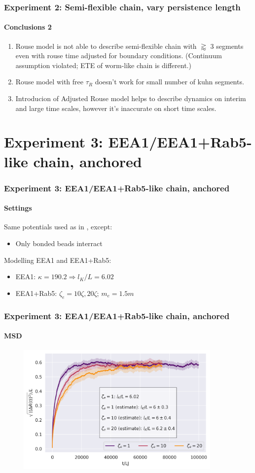 \documentclass[handout]{beamer}
\begin{document}
\begin{frame}
    \frametitle{Experiment 2: Semi-flexible chain, vary persistence length}
    \framesubtitle{Conclusions 2}
    \begin{enumerate}
        \item Rouse model is not able to describe semi-flexible chain with $\gtrapprox$ 3 segments
        even with rouse time adjusted for boundary conditions. 
        (Continuum assumption violated; ETE of worm-like chain is different.)
        \item Rouse model with free $\tau_R$ doesn't work for small number 
        of kuhn segments.
        \item Introducion of Adjusted Rouse model helps to describe dynamics on 
        interim and large time scales, however it's inaccurate on short time scales.
    \end{enumerate}
\end{frame}

\section{Experiment 3: EEA1/EEA1+Rab5-like chain, anchored}

\begin{frame}
    \frametitle{Experiment 3: EEA1/EEA1+Rab5-like chain, anchored}
    \framesubtitle{Settings}
    Same potentials used as in \cite[Section 2.1]{svaneborg_2020}, except:
    \begin{itemize}
        \item Only bonded beads interract
    \end{itemize}
    Modelling EEA1 and EEA1+Rab5:
    \begin{itemize}
        \item EEA1: $\kappa = 190.2 \Rightarrow l_K/L=6.02$ 
        \item EEA1+Rab5: $\zeta_e = 10\zeta, 20\zeta$; $m_e=1.5m$
    \end{itemize}
\end{frame}

\begin{frame}
    \frametitle{Experiment 3: EEA1/EEA1+Rab5-like chain, anchored}
    \framesubtitle{MSD}
    \framesubtitle{}
    \begin{figure}[h]
        \includegraphics[width=10cm]{./14+15+16-exp-msd.png}
    \end{figure}
\end{frame}
\end{document}
